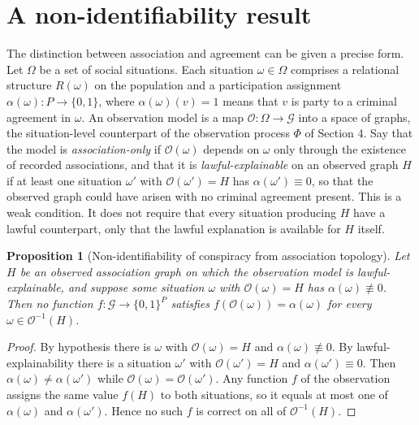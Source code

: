 \documentclass[11pt]{article}
\newtheorem{proposition}{Proposition}
\theoremstyle{definition}
\theoremstyle{remark}
\begin{document}
\section{A non-identifiability result}

The distinction between association and agreement can be given a precise form. Let $\Omega$ be a set of social situations. Each situation $\omega \in \Omega$ comprises a relational structure $R(\omega)$ on the population and a participation assignment $\alpha(\omega) : P \to \{0,1\}$, where $\alpha(\omega)(v) = 1$ means that $v$ is party to a criminal agreement in $\omega$. An observation model is a map $\mathcal{O} : \Omega \to \mathcal{G}$ into a space of graphs, the situation-level counterpart of the observation process $\Phi$ of Section 4. Say that the model is \emph{association-only} if $\mathcal{O}(\omega)$ depends on $\omega$ only through the existence of recorded associations, and that it is \emph{lawful-explainable} on an observed graph $H$ if at least one situation $\omega'$ with $\mathcal{O}(\omega') = H$ has $\alpha(\omega') \equiv 0$, so that the observed graph could have arisen with no criminal agreement present. This is a weak condition. It does not require that every situation producing $H$ have a lawful counterpart, only that the lawful explanation is available for $H$ itself.

\begin{proposition}[Non-identifiability of conspiracy from association topology]
Let $H$ be an observed association graph on which the observation model is lawful-explainable, and suppose some situation $\omega$ with $\mathcal{O}(\omega) = H$ has $\alpha(\omega) \not\equiv 0$. Then no function $f : \mathcal{G} \to \{0,1\}^P$ satisfies $f(\mathcal{O}(\omega)) = \alpha(\omega)$ for every $\omega \in \mathcal{O}^{-1}(H)$.
\end{proposition}

\begin{proof}
By hypothesis there is $\omega$ with $\mathcal{O}(\omega) = H$ and $\alpha(\omega) \not\equiv 0$. By lawful-explainability there is a situation $\omega'$ with $\mathcal{O}(\omega') = H$ and $\alpha(\omega') \equiv 0$. Then $\alpha(\omega) \neq \alpha(\omega')$ while $\mathcal{O}(\omega) = \mathcal{O}(\omega')$. Any function $f$ of the observation assigns the same value $f(H)$ to both situations, so it equals at most one of $\alpha(\omega)$ and $\alpha(\omega')$. Hence no such $f$ is correct on all of $\mathcal{O}^{-1}(H)$.
\end{proof}
\end{document}
